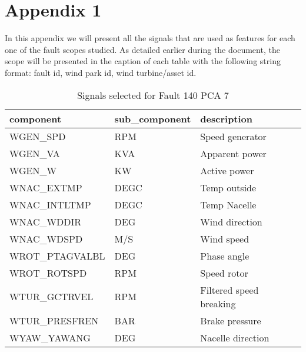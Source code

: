 


\chapter{Appendix 1}
\label{appendix1}

In this appendix we will present all the signals that are used as features for each one of the fault scopes studied. As detailed earlier during the document, the scope will be presented in the caption of each table with the following string format: fault id, wind park id, wind turbine/asset id.

\begin{table}[h!t]
    \centering
    \begin{tabular}{|l|l|l|}
    \hline
        component & sub\_component & description \\ \hline
        WGEN\_SPD & RPM & Speed generator \\ \hline
        WGEN\_VA & KVA & Apparent power \\ \hline
        WGEN\_W & KW & Active power \\ \hline
        WNAC\_EXTMP & DEGC & Temp outside \\ \hline
        WNAC\_INTLTMP & DEGC & Temp Nacelle \\ \hline
        WNAC\_WDDIR & DEG & Wind direction \\ \hline
        WNAC\_WDSPD & M/S & Wind speed \\ \hline
        WROT\_PTAGVALBL & DEG & Phase angle \\ \hline
        WROT\_ROTSPD & RPM & Speed rotor \\ \hline
        WTUR\_GCTRVEL & RPM & Filtered speed breaking \\ \hline
        WTUR\_PRESFREN & BAR & Brake pressure \\ \hline
        WYAW\_YAWANG & DEG & Nacelle direction \\ \hline
    \end{tabular}
    \caption{Signals selected for Fault 140 PCA 7}
\end{table}

